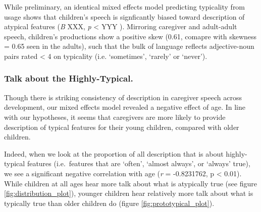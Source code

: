 \documentclass[10pt, letterpaper]{article}
\begin{document}
While preliminary, an identical mixed effects model predicting
typicality from usage shows that children's speech is signficantly
biased toward description of atypical features (\emph{B} XXX, \emph{p}
\textless{} YYY ). Mirroring caregiver and adult-adult speech,
children's productions show a positive skew (0.61, comapre with skewness
= 0.65 seen in the adults), such that the bulk of language reflects
adjective-noun pairs rated \textless{} 4 on typicality (i.e.
`sometimes', `rarely' or `never').

\hypertarget{talk-about-the-highly-typical.}{%
\subsubsection{Talk about the
Highly-Typical.}\label{talk-about-the-highly-typical.}}

Though there is striking consistency of description in caregiver speech
across development, our mixed effects model revealed a negative effect
of age. In line with our hypotheses, it seems that caregivers are more
likely to provide description of typical features for their young
children, compared with older children.

Indeed, when we look at the proportion of all description that is about
highly-typical features (i.e.~features that are `often', `almost
always', or `always' true), we see a significant negative correlation
with age (\emph{r} = -0.8231762, p \textless{} 0.01). While children at
all ages hear more talk about what is atypically true (see figure
\ref{fig:distribution_plot}), younger children hear relatively more talk
about what is typically true than older children do (figure
\ref{fig:prototypical_plot}).
\end{document}
